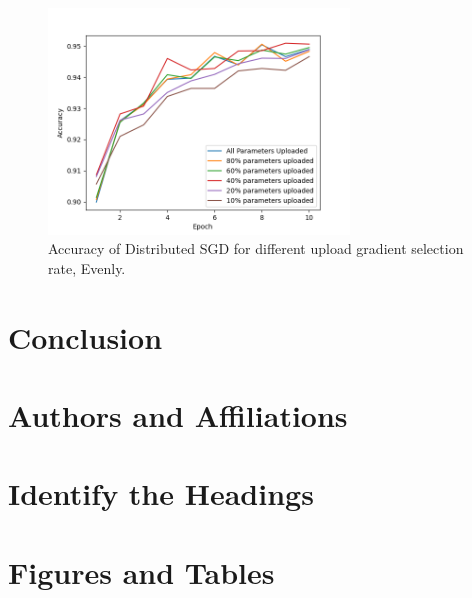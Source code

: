 \documentclass[conference]{IEEEtran}
\begin{document}
\begin{figure}[!h]
\includegraphics[width=8cm, keepaspectratio]{VaryingThetaUEvenly}
\caption{Accuracy of Distributed SGD for different upload gradient selection rate, Evenly. }
\label{fig:VaryingThetaUEvenly}
\end{figure}

\section{Conclusion}


\section{Authors and Affiliations}


\section{Identify the Headings}


\section{Figures and Tables}





\end{document}
